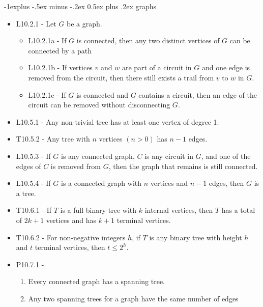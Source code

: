 \documentclass[10pt, landscape]{article}
\makeatletter
\renewcommand{\subsection}{\@startsection{subsection}{2}{0mm}%
                                {-1explus -.5ex minus -.2ex}%
                                {0.5ex plus .2ex}%
                                {\normalfont\normalsize\bfseries}}
\makeatother
\begin{document}
\begin{multicols}{3}
    \subsection{graphs}
    \begin{itemize}
        \item L10.2.1 - Let $G$ be a graph.
        \begin{itemize}
            \item L10.2.1a - If $G$ is connected, then any two distinct vertices of $G$ can be connected by a path
            \item L10.2.1b - If vertices $v$ and $w$ are part of a circuit in $G$ and one edge is removed from the circuit, then there still exists a trail from $v$ to $w$ in $G$.
            \item L10.2.1c - If $G$ is connected and $G$ contains a circuit, then an edge of the circuit can be removed without disconnecting $G$.
        \end{itemize}
        \item L10.5.1 - Any non-trivial tree has at least one vertex of degree 1.
        \item T10.5.2 - Any tree with $n$ vertices $(n>0)$ has $n-1$ edges.
        \item L10.5.3 - If $G$ is any connected graph, $C$ is any circuit in $G$, and one of the edges of $C$ is removed from $G$, then the graph that remains is still connected.
        \item L10.5.4 - If $G$ is a connected graph with $n$ vertices and $n-1$ edges, then $G$ is a tree.
        \item T10.6.1 - If $T$ is a full binary tree with $k$ internal vertices, then $T$ has a total of $2k + 1$ vertices and has $k+1$ terminal vertices.
        \item T10.6.2 - For non-negative integers $h$, if $T$ is any binary tree with height $h$ and $t$ terminal vertices, then $t \leq 2^h$.
        \item P10.7.1 - 
        \begin{enumerate}
            \item Every connected graph has a spanning tree.
            \item Any two spanning trees for a graph have the same number of edges
        \end{enumerate} 
    \end{itemize}

\begin{center}
\end{center}
\end{multicols}
\end{document}
